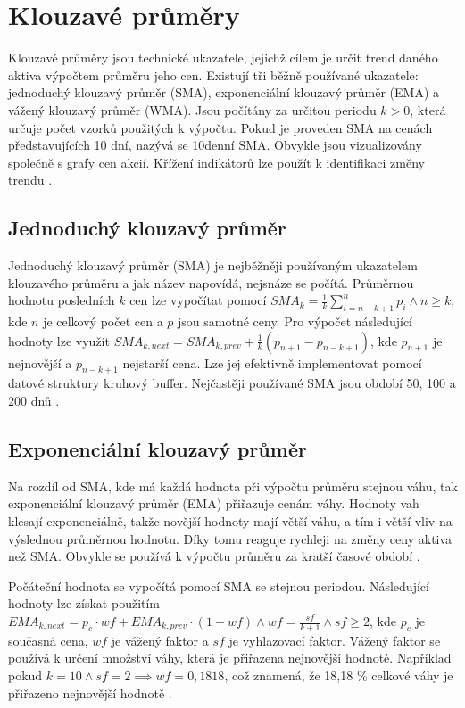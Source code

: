 \section{Klouzavé průměry}
Klouzavé průměry jsou technické ukazatele, jejichž cílem je určit trend daného aktiva výpočtem průměru jeho cen.
Existují tři běžně používané ukazatele: jednoduchý klouzavý průměr (SMA), exponenciální klouzavý průměr (EMA) a vážený klouzavý průměr (WMA).
Jsou počítány za určitou periodu $k>0$, která určuje počet vzorků použitých k výpočtu.
Pokud je proveden SMA na cenách představujících 10 dní, nazývá se 10denní SMA.
Obvykle jsou vizualizovány společně s grafy cen akcií.
Křížení indikátorů lze použít k identifikaci změny trendu  \cite{ma-algorithms}.

\subsection{Jednoduchý klouzavý průměr}
Jednoduchý klouzavý průměr (SMA) je nejběžněji používaným ukazatelem klouzavého průměru a jak název napovídá, nejsnáze se počítá.
Průměrnou hodnotu posledních $k$ cen lze vypočítat pomocí $SMA_k = \frac{1}{k}\sum_{i=n-k+1}^{n} p_i \land n\ge k$, kde $n$ je celkový počet cen a $p$ jsou samotné ceny.
Pro výpočet následující hodnoty lze využít $SMA_{k,next}=SMA_{k,prev}+\frac{1}{k}(p_{n+1}-p_{n-k+1})$, kde $p_{n+1}$ je nejnovější a $p_{n-k+1}$ nejstarší cena.
Lze jej efektivně implementovat pomocí datové struktury kruhový buffer.
Nejčastěji používané SMA jsou období 50, 100 a 200 dnů \cite{ma-algorithms, sma-wiki}.

\subsection{Exponenciální klouzavý průměr}
Na rozdíl od SMA, kde má každá hodnota při výpočtu průměru stejnou váhu, tak exponenciální klouzavý průměr (EMA) přiřazuje cenám váhy.
Hodnoty vah klesají exponenciálně, takže novější hodnoty mají větší váhu, a tím i větší vliv na výslednou průměrnou hodnotu.
Díky tomu reaguje rychleji na změny ceny aktiva než SMA.
Obvykle se používá k výpočtu průměru za kratší časové období \cite{ma-algorithms, ema-institute}.

Počáteční hodnota se vypočítá pomocí SMA se stejnou periodou.
Následující hodnoty lze získat použitím
$EMA_{k, next} = p_c \cdot wf + EMA_{k, prev} \cdot (1-wf) \land wf=\frac{sf}{k+1} \land sf\geq2$, kde $p_c$ je současná cena, $wf$ je vážený faktor a $sf$ je vyhlazovací faktor.
Vážený faktor se používá k určení množství váhy, která je přiřazena nejnovější hodnotě.
Například pokud $k=10 \land sf=2 \implies wf = 0,1818$, což znamená, že 18,18 \% celkové váhy je přiřazeno nejnovější hodnotě \cite{ma-stockcharts}.

